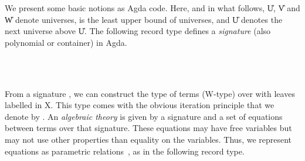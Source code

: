 \documentclass{easychair}
\begin{document}
We present some basic notions as Agda code.
Here, and in what follows, \U{U}, \U{V} and \U{W}
denote universes,  is the least upper bound of universes,
and \U{U} denotes the next universe above \U{U}.
The following record type defines a \emph{signature} (also polynomial or
container) in Agda.
\begin{code}%
\>[0]\AgdaSpace{}%
\AgdaSpace{}%
\AgdaSymbol{(}\AgdaSpace{}%
\AgdaSymbol{)}\AgdaSpace{}%
\AgdaSymbol{:}\AgdaSpace{}%
\AgdaSymbol{(}\AgdaSpace{}%
\AgdaSpace{}%
\AgdaSymbol{)}\AgdaSpace{}%
\AgdaSpace{}%
\AgdaSpace{}%
\<%
\\
\>[2][@{}l@{\AgdaIndent{0}}]%
\>[4]%
\>[9]\AgdaSymbol{:}\AgdaSpace{}%
\AgdaSpace{}%
\<%
\\
%
\>[4]%
\>[9]\AgdaSymbol{:}\AgdaSpace{}%
\AgdaSpace{}%
\AgdaSpace{}%
\AgdaSpace{}%
\<%
\end{code}
From a signature \sig \ofT {}, we can construct the type
 of terms (W-type) over \sig{} with leaves labelled in X.
This type comes with the obvious iteration principle that we denote by
.
An \emph{algebraic theory} is given by a signature and a set of equations
between terms over that signature.
These equations may have free variables but may not use other properties than
equality on the variables.
Thus, we represent equations as parametric
relations~\cite{Hermida14:LogicalRelationsParametricity}, as in the following
record type.
\end{document}
